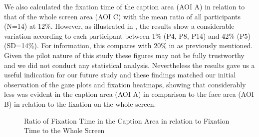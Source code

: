\documentclass[output=paper]{langsci/langscibook}
\begin{document}
\largerpage[-1] 
We also calculated the fixation time of the caption area (AOI A) in relation to that of the whole screen area (AOI C) with the mean ratio of all participants (N=14) at 12\%.  However, as illustrated in , the results show a considerable variation according to each participant between 1\% (P4, P8, P14) and 42\% (P5) (SD=14\%).  For information, this compares with 20\% in \citet{dydewalle1991} as previously mentioned. Given the pilot nature of this study these figures may not be fully trustworthy and we did not conduct any statistical analysis. Nevertheless the results gave us a useful indication for our future study and these findings matched our initial observation of the gaze plots and fixation heatmaps, showing that considerably less  was evident in the caption area (AOI A) in comparison to the face area (AOI B) in relation to the fixation on the whole screen.  

\begin{figure}



\caption{Ratio of Fixation Time in the Caption Area in relation to Fixation Time to the Whole Screen}
\label{ohagan:fig:5}
\end{figure}
\end{document}
